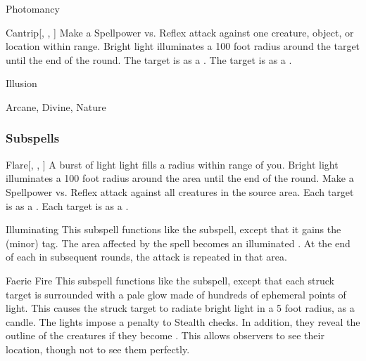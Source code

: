 \newpage
\begin{spellsection}{Photomancy}


\begin{ability}{Cantrip}[, , ]
Make a Spellpower vs. Reflex attack against one creature, object, or location within \rngmed range.
Bright light illuminates a 100 foot radius around the target until the end of the round.
\hit The target is \dazzled as a .
\crit The target is \blinded as a .
\end{ability}




 Illusion

 Arcane, Divine, Nature
\end{spellsection}


\subsubsection{Subspells}


\begin{ability}[\nth{1}]{Flare}[, , ]
A burst of light light fills a \areasmall radius within \rngmed range of you.
Bright light illuminates a 100 foot radius around the area until the end of the round.
Make a Spellpower vs. Reflex attack against all creatures in the source area.
\hit Each target is \dazzled as a .
\crit Each target is \blinded as a .
\end{ability}
\vspace{0.25em}


\begin{ability}[\nth{2}]{Illuminating}
This subspell functions like the  subspell, except that it gains the  (minor) tag.
The area affected by the spell becomes an illuminated .
At the end of each  in subsequent rounds, the attack is repeated in that area.
\end{ability}
\vspace{0.25em}


\begin{ability}[\nth{3}]{Faerie Fire}
This subspell functions like the  subspell, except that each struck target is surrounded with a pale glow made of hundreds of ephemeral points of light.
This causes the struck target to radiate bright light in a 5 foot radius, as a candle.
The lights impose a  penalty to Stealth checks.
In addition, they reveal the outline of the creatures if they become .
This allows observers to see their location, though not to see them perfectly.
\end{ability}
\vspace{0.25em}


